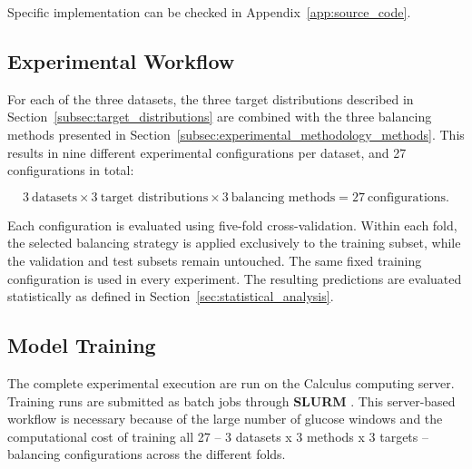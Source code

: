 Specific implementation can be checked in Appendix~\ref{app:source_code}.

\subsection{Experimental Workflow}
\label{subsec:experimental_workflow}

For each of the three datasets, the three target distributions described in Section~\ref{subsec:target_distributions} are combined with the three balancing methods presented in Section~\ref{subsec:experimental_methodology_methods}. This results in nine different experimental configurations per dataset, and 27 configurations in total:

\[
3\ \text{datasets}
\times
3\ \text{target distributions}
\times
3\ \text{balancing methods}
=
27\ \text{configurations}.
\]

Each configuration is evaluated using five-fold cross-validation. Within each fold, the selected balancing strategy is applied exclusively to the training subset, while the validation and test subsets remain untouched. The same fixed training configuration is used in every experiment. The resulting predictions are evaluated statistically as defined in Section~\ref{sec:statistical_analysis}.

\subsection{Model Training}
\label{sec:model_training}

The complete experimental execution are run on the Calculus computing server. Training runs are submitted as batch jobs through \textbf{SLURM} \cite{slurm_documentation}. This server-based workflow is necessary because of the large number of glucose windows and the computational cost of training all 27 -- 3 datasets x 3 methods x 3 targets -- balancing configurations across the different folds.